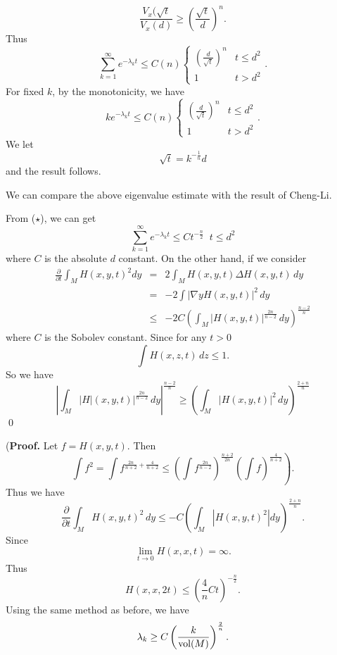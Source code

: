 %
\[  \frac{V_x  (\sqrt{t}}{ V _x (d)} \geq \left( \frac{\sqrt{t}}{d}\right) ^n .\]
%
Thus 
%
\begin{equation}\sum^\infty_{k=1} e ^{-\lambda _{k} t} \leq C(n)\left\{ \begin{array}{ll} \left(\frac{d}{\sqrt{t}}\right) ^n &t \leq d^2\\
 1  &t > d^2 \end{array} \right. .\tag{$\star$}\end{equation}
%
For fixed $k$, by the monotonicity, we have 
\[ke ^{-\lambda _{k} t} \leq C(n)\left\{ \begin{array}{ll} \left(\frac{d}{\sqrt{t}}\right) ^n &t \leq d^2\\
 1  &t > d^2 \end{array} \right. .\]
%
We let
%
\[ \sqrt{t} = k ^{-\frac{1}{n}} d \]
%
and the result follows.

We can compare the above eigenvalue estimate with the result of Cheng-Li.

From ($\star$), we can get 
%
\[ \sum^\infty_{k=1} e ^{- \lambda _{k} t} \leq C t ^{-\frac{n}{2}}\;\; t \leq d^2\]
%
where $C$ is the absolute $d$  constant. On the other hand, if we consider
%
\begin{eqnarray*}
\frac{\partial }{\partial t} \int_M H (x, y, t) ^2 d y &= & 2 \int_M H (x, y, t) \Delta H (x , y, t) \, dy\\ &  =&- 2 \int | \nabla y H (x, y, t)  | ^2 \, dy\\
&  \leq & - 2 C \left( \int_M |H (x, y, t) | ^{\frac{2n}{n-2}} \, dy \right) ^{\frac{n-2}{n}} \end{eqnarray*}
%
where $C$ is the Sobolev constant. Since for any $ t > 0 $
%
\[\int H (x, z, t) \, d z \leq 1.\]
%
So we have 
\[ \left|\int _M |H | (x, y, t) | ^{\frac{2n}{n-2}} \, dy \right| ^{\frac{n-2}{n}}\geq \left( \int_M |H (x, y, t) | ^{2} \, dy \right) ^{\frac{2+n}{n}}\]
\qed

\noindent({\bf Proof.} Let $ f = H (x, y, t) $. Then 
\[ \int f ^2 = \int f ^{\frac{2n}{n+2}+ \frac{4}{n+2}}\leq \left(  \int f^{\frac{2n}{n-2}}\right) ^{\frac{n+2}{2n}}\left. \left( \int f \right) ^{\frac{4}{n+2}}\right).\]
Thus we have 
%
\[\frac{\partial }{\partial t}\int _M H(x, y, t)^2 \, dy  \leq - C \left( \int_M |H (x, y, t) ^2 | dy \right) ^{\frac{2+n}{n}}.\]
%
Since
%
\[\lim_{t \rightarrow 0} H (x, x, t) = \infty.\]
%
Thus 
%
\[ H (x, x, 2t) \leq \left( \frac{4}{n} Ct \right) ^{-\frac{n}{2}}.\]
%
Using the same method as before, we have 
%
\[\lambda _k \geq C \left( \frac{k}{{\rm vol} (M)}\right) ^{\frac{2}{n}}.\]
%


